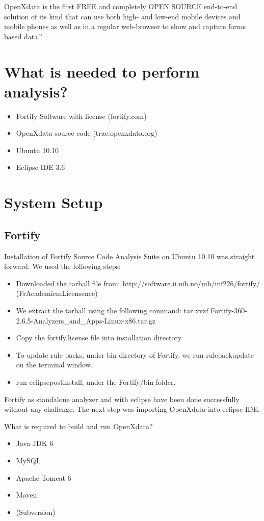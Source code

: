 \documentclass[11pt,a4paper]{article}
\theoremstyle{definition}
\begin{document}
OpenXdata is the first FREE and completely OPEN SOURCE end-to-end
solution of its kind that can use both high- and low-end mobile devices
and mobile phones as well as in a regular web-browser to show and
capture forms based data.”


\section{What is needed to perform analysis?}
\begin{itemize}
 \item Fortify Software with license (fortify.com)
 \item OpenXdata source code (trac.openxdata.org)
 \item Ubuntu 10.10
 \item Eclipse IDE 3.6
\end{itemize}

\section{System Setup}

\subsection{Fortify}

Installation of Fortify Source Code Analysis Suite on Ubuntu 10.10 was straight forward. We used the following steps:
\begin{itemize}
 \item Downloaded the tarball file from: http://software.ii.uib.no/uib/inf226/fortify/ (FrAcademicmLicensence)
 \item We extract the tarball using the following command: tar xvzf Fortify-360-2.6.5-Analyzers_and_Apps-Linux-x86.tar.gz
 \item Copy the fortify.license file into installation directory.
 \item To update rule packs, under bin directory of Fortify, we run rulepackupdate on the terminal window.
 \item run eclipsepostinstall, under the Fortify/bin folder.
\end{itemize}

Fortify as standalone analyzer and with eclipse have been done successfully without any challenge.
The next step was importing OpenXdata into eclipse IDE.

What is required to build and run OpenXdata?
\begin{itemize}
 \item Java JDK 6
 \item MySQL
 \item Apache Tomcat 6
 \item Maven
 \item (Subversion)
\end{itemize}
\end{document}
